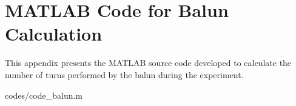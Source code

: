 \chapter{MATLAB Code for Balun Calculation}
\label{apendice5}

This appendix presents the MATLAB source code developed to calculate the number
of turns performed by the balun during the experiment.


{codes/code_balun.m}
